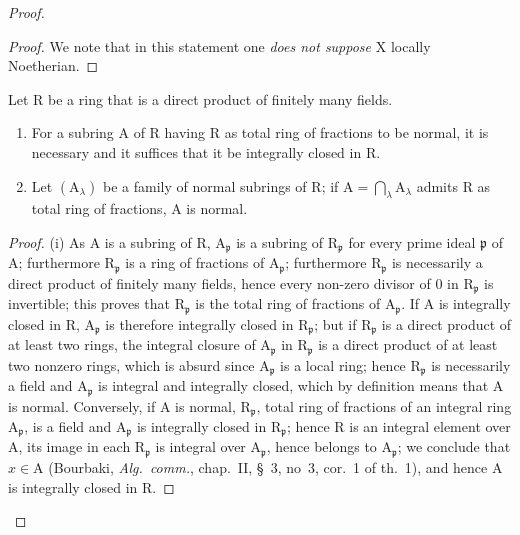 \begin{proof}
\begin{proof}
We note that in this statement one \emph{does not suppose} $\mathrm{X}$ locally Noetherian.
\end{proof}

\begin{lemma}[6.14.1.1]
\label{IV.6.14.1.1}
Let $\mathrm{R}$ be a ring that is a direct product of finitely many fields.
\begin{enumerate}[label=(\roman*)]
  \item For a subring $\mathrm{A}$ of $\mathrm{R}$ having $\mathrm{R}$ as total ring of fractions to be normal,
it is necessary and it suffices that it be integrally closed in $\mathrm{R}$.
  \item Let $(\mathrm{A}_\lambda)$ be a family of normal subrings of $\mathrm{R}$; if $\mathrm{A}=\bigcap_\lambda\mathrm{A}_\lambda$ admits $\mathrm{R}$ as
total ring of fractions, $\mathrm{A}$ is normal.
\end{enumerate}
\end{lemma}

\begin{proof}
(i) As $\mathrm{A}$ is a subring of $\mathrm{R}$, $\mathrm{A}_\mathfrak{p}$ is a subring of $\mathrm{R}_\mathfrak{p}$ for every
prime ideal $\mathfrak{p}$ of $\mathrm{A}$; furthermore $\mathrm{R}_\mathfrak{p}$ is a ring of fractions of $\mathrm{A}_\mathfrak{p}$; furthermore $\mathrm{R}_\mathfrak{p}$ is necessarily
a direct product of finitely many fields, hence every non-zero divisor
of $0$ in $\mathrm{R}_\mathfrak{p}$ is invertible; this proves that $\mathrm{R}_\mathfrak{p}$ is the total ring of fractions of $\mathrm{A}_\mathfrak{p}$.
If $\mathrm{A}$ is integrally closed in $\mathrm{R}$, $\mathrm{A}_\mathfrak{p}$ is therefore integrally closed in $\mathrm{R}_\mathfrak{p}$; but
if $\mathrm{R}_\mathfrak{p}$ is a direct product of at least two rings, the integral closure of $\mathrm{A}_\mathfrak{p}$ in $\mathrm{R}_\mathfrak{p}$ is
a direct product of at least two nonzero rings, which is absurd since $\mathrm{A}_\mathfrak{p}$
is a local ring; hence $\mathrm{R}_\mathfrak{p}$ is necessarily a field and $\mathrm{A}_\mathfrak{p}$ is integral and integrally
closed, which by definition means that $\mathrm{A}$ is normal. Conversely, if $\mathrm{A}$ is normal,
$\mathrm{R}_\mathfrak{p}$, total ring of fractions of an integral ring $\mathrm{A}_\mathfrak{p}$, is a field and $\mathrm{A}_\mathfrak{p}$ is integrally
closed in $\mathrm{R}_\mathfrak{p}$; hence $\mathrm{R}$ is an integral element over $\mathrm{A}$, its image in each $\mathrm{R}_\mathfrak{p}$ is
integral over $\mathrm{A}_\mathfrak{p}$, hence belongs to $\mathrm{A}_\mathfrak{p}$; we conclude that $x\in\mathrm{A}$ (Bourbaki, \emph{Alg.~comm.},
chap.~II, \S~3, no~3, cor.~1 of th.~1), and hence $\mathrm{A}$ is integrally closed in $\mathrm{R}$.


\end{proof}
\end{proof}
